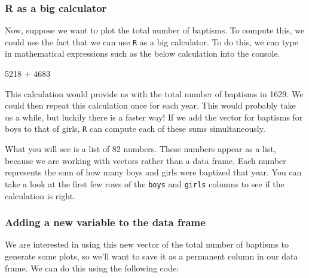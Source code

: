 \documentclass[
]{article}
\newenvironment{Shaded}{\begin{snugshade}}{\end{snugshade}}
\newcommand{\DecValTok}[1]{\textcolor[rgb]{0.00,0.00,0.81}{#1}}
\newcommand{\NormalTok}[1]{#1}
\newcommand{\SpecialCharTok}[1]{\textcolor[rgb]{0.00,0.00,0.00}{#1}}
\begin{document}
\hypertarget{r-as-a-big-calculator}{%
\subsubsection{R as a big calculator}\label{r-as-a-big-calculator}}

Now, suppose we want to plot the total number of baptisms. To compute this, we could use the fact that we can use \texttt{R} as a big calculator. To do this, we can type in mathematical expressions such as the below calculation into the console.

\begin{Shaded}
\begin{Highlighting}[]
\DecValTok{5218} \SpecialCharTok{+} \DecValTok{4683}
\end{Highlighting}
\end{Shaded}

This calculation would provide us with the total number of baptisms in 1629. We could then repeat this calculation once for each year. This would probably take us a while, but luckily there is a faster way! If we add the vector for baptisms for boys to that of girls, \texttt{R} can compute each of these sums simultaneously.

\begin{Shaded}
\end{Shaded}

What you will see is a list of 82 numbers. These numbers appear as a list, because we are working with vectors rather than a data frame. Each number represents the sum of how many boys and girls were baptized that year. You can take a look at the first few rows of the \texttt{boys} and \texttt{girls} columns to see if the calculation is right.

\hypertarget{adding-a-new-variable-to-the-data-frame}{%
\subsubsection{Adding a new variable to the data frame}\label{adding-a-new-variable-to-the-data-frame}}

We are interested in using this new vector of the total number of baptisms to generate some plots, so we'll want to save it as a permanent column in our data frame. We can do this using the following code:
\end{document}
